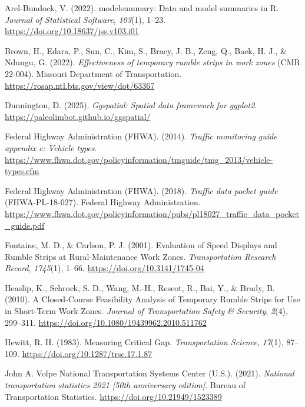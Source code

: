 \documentclass[
  letterpaper,
]{trb}
\newlength{\cslhangindent}
\newenvironment{CSLReferences}[2] %
 {\begin{list}{}{%
  \setlength{\itemindent}{0pt}
  \setlength{\leftmargin}{0pt}
  \setlength{\parsep}{0pt}
  \ifodd #1
   \setlength{\leftmargin}{\cslhangindent}
   \setlength{\itemindent}{-1\cslhangindent}
  \fi
  \setlength{\itemsep}{#2\baselineskip}}}
 {\end{list}}
\begin{document}
\label{refs}
\begin{CSLReferences}{1}{0}
Arel-Bundock, V. (2022). {modelsummary}: Data and model summaries in
{R}. \emph{Journal of Statistical Software}, \emph{103}(1), 1--23.
\url{https://doi.org/10.18637/jss.v103.i01}

Brown, H., Edara, P., Sun, C., Kim, S., Bracy, J. B., Zeng, Q., Baek, H.
J., \& Ndungu, G. (2022). \emph{Effectiveness of temporary rumble strips
in work zones} (CMR 22-004). Missouri Department of Transportation.
\url{https://rosap.ntl.bts.gov/view/dot/63367}

Dunnington, D. (2025). \emph{Ggspatial: Spatial data framework for
ggplot2}. \url{https://paleolimbot.github.io/ggspatial/}

Federal Highway Administration (FHWA). (2014). \emph{Traffic monitoring
guide appendix c: Vehicle types}.
\url{https://www.fhwa.dot.gov/policyinformation/tmguide/tmg_2013/vehicle-types.cfm}

Federal Highway Administration (FHWA). (2018). \emph{Traffic data pocket
guide} (FHWA-PL-18-027). Federal Highway Administration.
\url{https://www.fhwa.dot.gov/policyinformation/pubs/pl18027_traffic_data_pocket_guide.pdf}

Fontaine, M. D., \& Carlson, P. J. (2001). Evaluation of {Speed
Displays} and {Rumble Strips} at {Rural-Maintenance Work Zones}.
\emph{Transportation Research Record}, \emph{1745}(1), 1--66.
\url{https://doi.org/10.3141/1745-04}

Heaslip, K., Schrock, S. D., Wang, M.-H., Rescot, R., Bai, Y., \& Brady,
B. (2010). A {Closed-Course Feasibility Analysis} of {Temporary Rumble
Strips} for {Use} in {Short-Term Work Zones}. \emph{Journal of
Transportation Safety \& Security}, \emph{2}(4), 299--311.
\url{https://doi.org/10.1080/19439962.2010.511762}

Hewitt, R. H. (1983). Measuring {Critical Gap}. \emph{Transportation
Science}, \emph{17}(1), 87--109.
\url{https://doi.org/10.1287/trsc.17.1.87}

John A. Volpe National Transportation Systems Center (U.S.). (2021).
\emph{National transportation statistics 2021 {[}50th anniversary
edition{]}}. Bureau of Transportation Statistics.
\url{https://doi.org/10.21949/1523389}


\end{CSLReferences}
\end{document}
